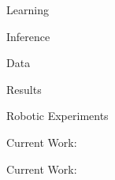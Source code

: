 \documentclass{beamer}
\begin{document}
\begin{frame}{Learning}

\end{frame}

\begin{frame}{Inference}
 
 
\end{frame}

\begin{frame}{Data}

\end{frame}


\begin{frame}{Results }
\end{frame}

\begin{frame}{Robotic Experiments}
\end{frame}

\begin{frame}{Current Work: }
\end{frame}

\begin{frame}{Current Work: }
\end{frame}
\end{document}
